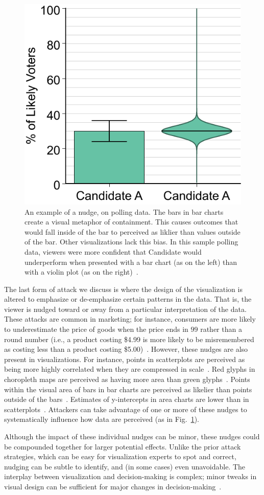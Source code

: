 \documentclass{vgtc}                          %
\begin{document}
\begin{figure}
	\centering
	\includegraphics[width=0.45\columnwidth]{pictures/within}
	\caption{An example of a nudge, on polling data. The bars in bar charts create a visual metaphor of containment. This causes outcomes that would fall inside of the bar to perceived as liklier than values outside of the bar. Other visualizations lack this bias. In this sample polling data, viewers were more confident that Candidate would underperform when presented with a bar chart (as on the left) than with a violin plot (as on the right)~\protect\cite{correll2014error}.}
	\label{fig:nudge}
\end{figure}

The last form of attack we discuss is where the design of the visualization is altered to emphasize or de-emphasize certain patterns in the data. That is, the viewer is nudged toward or away from a particular interpretation of the data. These attacks are common in marketing; for instance, consumers are more likely to underestimate the price of goods when the price ends in $99$ rather than a round number (i.e., a product costing \$4.99 is more likely to be misremembered as costing less than a product costing \$5.00)~\cite{schindler1989effects}. However, these nudges are also present in visualizations. For instance, points in scatterplots are perceived as being more highly correlated when they are compressed in scale~\cite{cleveland1982variables}. Red glyphs in choropleth maps are perceived as having more area than green glyphs~\cite{cleveland1983color}. Points within the visual area of bars in bar charts are perceived as likelier than points outside of the bars~\cite{newman2012bar}. Estimates of y-intercepts in area charts are lower than in scatterplots~\cite{correll2017regression}. Attackers can take advantage of one or more of these nudges to systematically influence how data are perceived (as in Fig.~\ref{fig:nudge}). 

Although the impact of these individual nudges can be minor, these nudges could be compounded together for larger potential effects. Unlike the prior attack strategies, which can be easy for visualization experts to spot and correct, nudging can be subtle to identify, and (in some cases) even unavoidable. The interplay between visualization and decision-making is complex; minor tweaks in visual design can be sufficient for major changes in decision-making~\cite{inbar2007graphical}.
\end{document}
